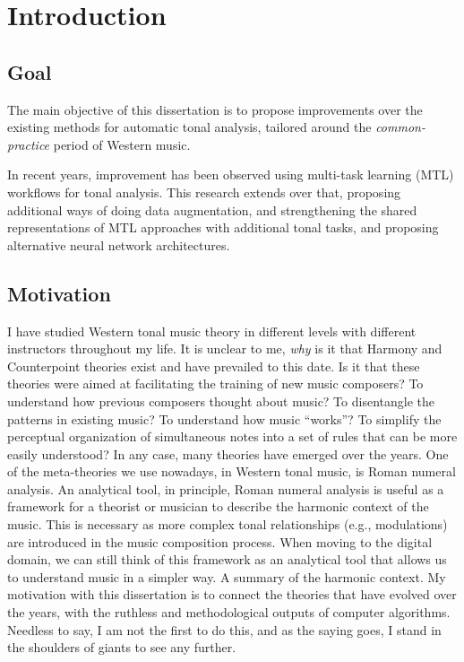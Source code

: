 \chapter{Introduction}
\label{chap:chap1}

    

\section{Goal}

The main objective of this dissertation is to propose improvements over the existing methods for automatic tonal analysis, tailored around the \emph{common-practice} period of Western music. 

In recent years, improvement has been observed using multi-task learning (MTL) workflows for tonal analysis.
This research extends over that, proposing additional ways of doing data augmentation, and strengthening the shared representations of MTL approaches with additional tonal tasks, and proposing alternative neural network architectures.

\section{Motivation}

I have studied Western tonal music theory in different levels with different instructors throughout my life.
It is unclear to me, \emph{why} is it that Harmony and Counterpoint theories exist and have prevailed to this date.
Is it that these theories were aimed at facilitating the training of new music composers? 
To understand how previous composers thought about music? 
To disentangle the patterns in existing music? 
To understand how music ``works''? 
To simplify the perceptual organization of simultaneous notes into a set of rules that can be more easily understood?
In any case, many theories have emerged over the years.
One of the meta-theories we use nowadays, in Western tonal music, is Roman numeral analysis.
An analytical tool, in principle, Roman numeral analysis is useful as a framework for a theorist or musician to describe the harmonic context of the music.
This is necessary as more complex tonal relationships (e.g., modulations) are introduced in the music composition process.
When moving to the digital domain, we can still think of this framework as an analytical tool that allows us to understand music in a simpler way.
A summary of the harmonic context.
My motivation with this dissertation is to connect the theories that have evolved over the years, with the ruthless and methodological outputs of computer algorithms.
Needless to say, I am not the first to do this, and as the saying goes, I stand in the shoulders of giants to see any further.

